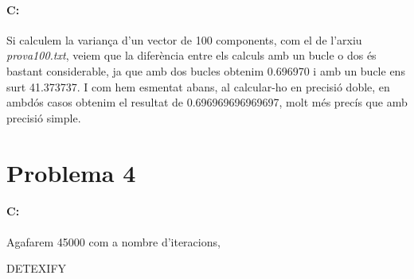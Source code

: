 \documentclass{article}
\begin{document}
	\paragraph{C:} Si calculem la variança d'un vector de 100 components, com el de l'arxiu \textit{prova100.txt}, veiem que la diferència entre els calculs amb un bucle o dos és bastant considerable, ja que amb dos bucles obtenim 0.696970 i amb un bucle ens surt 41.373737. I com hem esmentat abans, al calcular-ho en precisió doble, en ambdós casos obtenim el resultat de 0.696969696969697, molt més precís que amb precisió simple.
	
	\newpage
	
	\section{Problema 4}
	\paragraph{C:} Agafarem 45000 com a nombre d'iteracions,
	
	
	
	DETEXIFY
	
\end{document}
